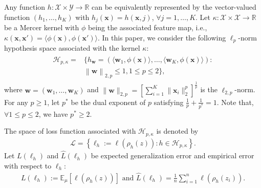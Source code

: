 \documentclass{article}
\begin{document}
Any function $h:\mathcal{X}\times\mathcal{Y}\rightarrow \mathbb{R}$ can be equivalently represented by the vector-valued function
$(h_1,\ldots,h_K)$ with $h_j(\mathbf x)=h(\mathbf x,j)$, $\forall j=1,\ldots,K$.
Let $\kappa:\mathcal{X}\times\mathcal{X}\rightarrow\mathbb{R}$ be a Mercer kernel with $\phi$ being the associated feature map,
i.e., $\kappa(\mathbf x,\mathbf x')=\langle \phi(\mathbf x),\phi(\mathbf x')\rangle$.
In this paper, we consider the following $\ell_p$-norm hypothesis space associated with the kernel $\kappa$:
 \begin{align}
 \label{hypothspapce}
   \begin{aligned}
   \mathcal{H}_{p,\kappa}=&\Big\{h_\mathbf{w}=\left(\langle \mathbf w_1,\phi(\mathbf x)\rangle,\ldots, \langle\mathbf w_K,\phi(\mathbf x)\rangle\right):\\
  & \left\|\mathbf  w \right\|_{2,p}\leq 1, 1\leq p\leq 2
  \Big\},
   \end{aligned}
 \end{align}
 where $\mathbf w=(\mathbf w_1,\ldots,\mathbf w_K)$ and $\|\mathbf w\|_{2,p}=\left[\sum_{i=1}^K\|\mathbf x_i\|_2^p\right]^{\frac{1}{p}}$
 is the $\ell_{2,p}$-norm.
 For any $p\geq 1$, let $p^\ast$ be the dual exponent of $p$ satisfying $\frac{1}{p}+\frac{1}{p^\ast}=1$.
 Note that,  $\forall 1\leq p\leq 2$, we have $p^\ast\geq 2$.

The space of loss function associated with $\mathcal{H}_{p,\kappa}$  is denoted by
\begin{align}
\label{eq-sapce-loss-functions}
  \mathcal{L}=\left\{\ell_h:=\ell(\rho_h(z)):h\in\mathcal{H}_{p,\kappa}\right\}.
\end{align}
Let $L(\ell_h)$ and  $\hat{L}(\ell_h)$ be expected generalization error and
 empirical error  with respect to $\ell_h$:
\begin{align*}
  L(\ell_h):=\mathbb{E}_\mu[\ell(\rho_h(z))] \text{ and } \hat{L}(\ell_h)=\frac{1}{n}\sum_{i=1}^n\ell(\rho_h(z_i)).
\end{align*}




\end{document}
